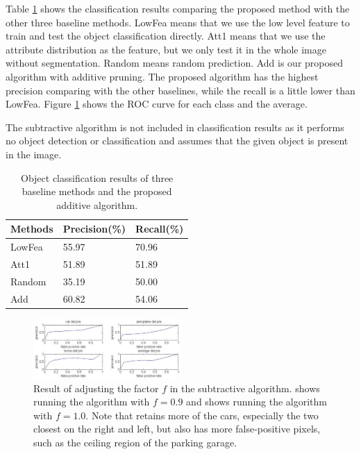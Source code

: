 \documentclass[10pt,twocolumn,letterpaper]{article}
\begin{document}
Table \ref{table:aresults} shows the classification results comparing the proposed method with 
the other three baseline methods. LowFea means that we use the low level feature to train and test 
the object classification directly. Att1 means that we use the attribute distribution as the feature,
but we only test it in the whole image without segmentation. Random means random prediction. Add is our
proposed algorithm with additive pruning. The proposed algorithm has the highest precision comparing 
with the other baselines, while the recall is a little lower than LowFea. Figure \ref{fig:roc_class} 
shows the ROC curve for each class and the average.

The subtractive algorithm is not included in classification results as it performs no
object detection or classification and assumes that the given object is present
in the image.


\begin{table}
\centering
\begin{tabular}{|l|l|l|}
\hline Methods & Precision(\%) & Recall(\%) \\
\hline LowFea  & 55.97 & 70.96 \\
\hline Att1    & 51.89 & 51.89 \\
\hline Random  & 35.19 & 50.00 \\
\hline Add     & 60.82 & 54.06 \\
\hline
\end{tabular}
\caption{Object classification results of three baseline methods and the proposed additive algorithm.}
\label{table:aresults}
\end{table}


\begin{figure}
\centering
\includegraphics[width=0.5\textwidth]{figures/add_res/roc_class.png.eps}
\caption{Result of adjusting the factor $f$ in the subtractive
algorithm.  shows running the algorithm with $f=0.9$
and  shows running the algorithm with $f=1.0$.  Note
that  retains more of the cars, especially the two
closest on the right and left, but also has more false-positive
pixels, such as the ceiling region of the parking garage.}
\label{fig:roc_class}
\end{figure}
\end{document}
